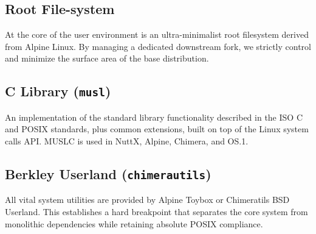 \documentclass{article}
\begin{document}
\subsection{Root File-system}
At the core of the user environment is an ultra-minimalist root filesystem derived from Alpine Linux. By managing a dedicated downstream fork, we strictly control and minimize the surface area of the base distribution.

\subsection{C Library (\texttt{musl})}
An implementation of the standard library functionality described in the ISO C and POSIX standards, plus common extensions, built on top of the Linux system calls API. MUSLC is used in NuttX, Alpine, Chimera, and OS.1.

\subsection{Berkley Userland (\texttt{chimerautils})}
All vital system utilities are provided by Alpine Toybox or Chimeratils BSD Userland. This establishes a hard breakpoint that separates the core system from monolithic dependencies while retaining absolute POSIX compliance.

\begin{center}
\end{center}
\end{document}

